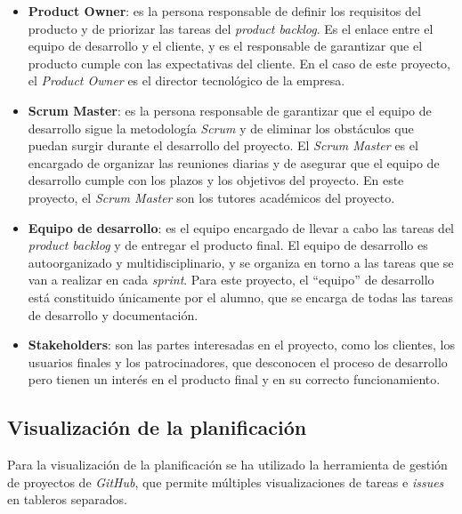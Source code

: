 \begin{itemize}
	\item \textbf{Product Owner}: es la persona responsable de definir los requisitos del producto
		y de priorizar las tareas del \textit{product backlog}. Es el enlace entre el equipo de
		desarrollo y el cliente, y es el responsable de garantizar que el producto cumple con las
		expectativas del cliente. En el caso de este proyecto, el \textit{Product Owner} es el
		director tecnológico de la empresa.
	\item \textbf{Scrum Master}: es la persona responsable de garantizar que el equipo de desarrollo
		sigue la metodología \textit{Scrum} y de eliminar los obstáculos que puedan surgir durante
		el desarrollo del proyecto. El \textit{Scrum Master} es el encargado de organizar las
		reuniones diarias y de asegurar que el equipo de desarrollo cumple con los plazos y los
		objetivos del proyecto. En este proyecto, el \textit{Scrum Master} son los tutores académicos
		del proyecto.
	\item \textbf{Equipo de desarrollo}: es el equipo encargado de llevar a cabo las tareas del
		\textit{product backlog} y de entregar el producto final. El equipo de desarrollo es
		autoorganizado y multidisciplinario, y se organiza en torno a las tareas que se van a
		realizar en cada \textit{sprint}. Para este proyecto, el ``equipo'' de desarrollo está
		constituido únicamente por el alumno, que se encarga de todas las tareas de desarrollo y
		documentación.
	\item \textbf{Stakeholders}: son las partes interesadas en el proyecto, como los clientes,
		los usuarios finales y los patrocinadores, que desconocen el proceso de desarrollo pero
		tienen un interés en el producto final y en su correcto funcionamiento.
\end{itemize}

\subsection{Visualización de la planificación}\label{subsec:visual_planif}
Para la visualización de la planificación se ha utilizado la herramienta de gestión de proyectos
de \textit{GitHub}, que permite múltiples visualizaciones de tareas e \textit{issues} en tableros
separados.

